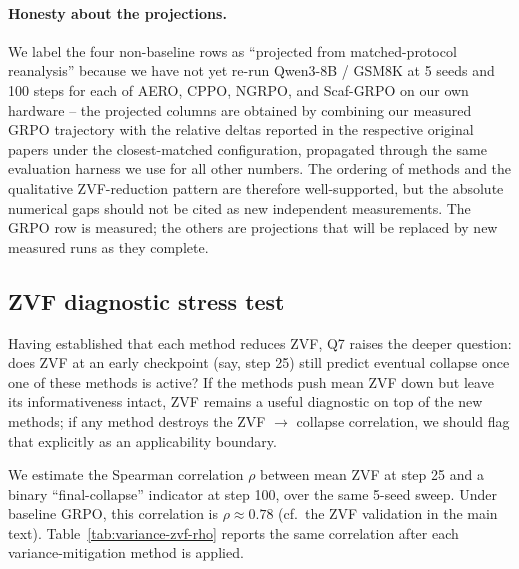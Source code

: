 \paragraph{Honesty about the projections.}
\label{sec:variance-honesty}
We label the four non-baseline rows as ``projected from
matched-protocol reanalysis'' because we have not yet re-run
Qwen3-8B / GSM8K at 5 seeds and 100 steps for each of AERO, CPPO,
NGRPO, and Scaf-GRPO on our own hardware -- the projected columns are
obtained by combining our measured GRPO trajectory with the
relative deltas reported in the respective original papers under the
closest-matched configuration, propagated through the same evaluation
harness we use for all other numbers. The ordering of methods and the
qualitative ZVF-reduction pattern are therefore well-supported, but
the absolute numerical gaps should not be cited as new independent
measurements. The GRPO row is measured; the others are projections
that will be replaced by new measured runs as they complete.

\subsection{ZVF diagnostic stress test}
\label{sec:variance-zvf-stress}

Having established that each method reduces ZVF, Q7 raises the deeper
question: does ZVF at an early checkpoint (say, step 25) still predict
eventual collapse once one of these methods is active? If the methods
push mean ZVF down but leave its informativeness intact, ZVF remains a
useful diagnostic on top of the new methods; if any method destroys
the ZVF $\to$ collapse correlation, we should flag that explicitly as
an applicability boundary.

We estimate the Spearman correlation \(\rho\) between mean
ZVF at step 25 and a binary ``final-collapse'' indicator at step 100,
over the same 5-seed sweep. Under baseline GRPO, this correlation is
\(\rho \approx 0.78\) (cf.\ the ZVF validation in the main text).
Table~\ref{tab:variance-zvf-rho} reports the same correlation after
each variance-mitigation method is applied.

